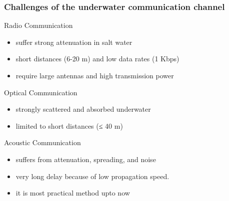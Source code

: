 \documentclass{beamer}
\begin{document}
\begin{frame}

\frametitle{Challenges of the underwater communication channel}
\begin{block}{Radio Communication}
\begin{itemize}
\item suffer strong attenuation in salt water
\item short distances (6-20 m) and low data rates (1 Kbps)
\item require large antennas and high transmission power
\end{itemize}
\end{block}

\begin{block}{Optical Communication}
\begin{itemize}
\item strongly scattered and absorbed underwater
\item  limited to short distances (≤ 40 m)
\end{itemize}
\end{block}

\begin{block}{Acoustic Communication}
\begin{itemize}
\item suffers from attenuation, spreading, and noise 
\item very long delay because of low propagation speed.
\item it is most practical method upto now 
\end{itemize}
\end{block}
\end{frame}
\end{document}
